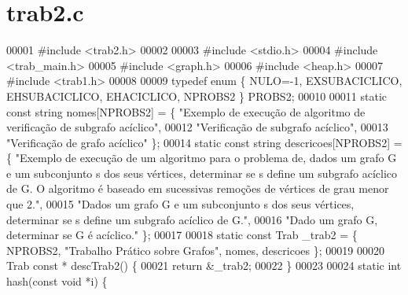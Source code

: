 \section{trab2.\+c}
\label{trab2_8c_source}

\begin{DoxyCode}
00001 \textcolor{preprocessor}{#include <trab2.h>}
00002 
00003 \textcolor{preprocessor}{#include <stdio.h>}
00004 \textcolor{preprocessor}{#include <trab_main.h>}
00005 \textcolor{preprocessor}{#include <graph.h>}
00006 \textcolor{preprocessor}{#include <heap.h>}
00007 \textcolor{preprocessor}{#include <trab1.h>}
00008 
00009 \textcolor{keyword}{typedef} \textcolor{keyword}{enum} \{ NULO=-1, EXSUBACICLICO, EHSUBACICLICO, EHACICLICO, NPROBS2 \} PROBS2;
00010 
00011 \textcolor{keyword}{static} \textcolor{keyword}{const} \textcolor{keywordtype}{string} nomes[NPROBS2] = \{  \textcolor{stringliteral}{"Exemplo de execução de algoritmo de verificação de subgrafo
       acíclico"},
00012                                                                                 \textcolor{stringliteral}{"Verificação de subgrafo
       acíclico"},
00013                                                                                 \textcolor{stringliteral}{"Verificação de grafo
       acíclico"} \};
00014 \textcolor{keyword}{static} \textcolor{keyword}{const} \textcolor{keywordtype}{string} descricoes[NPROBS2] = \{ \textcolor{stringliteral}{"Exemplo de execução de um algoritmo para o problema de, dados
       um grafo G e um subconjunto s dos seus vértices, determinar se s define um subgrafo acíclico de G. O
       algoritmo é baseado em sucessivas remoções de vértices de grau menor que 2."},
00015                                                                                         \textcolor{stringliteral}{"Dados um grafo G e
       um subconjunto s dos seus vértices, determinar se s define um subgrafo acíclico de G."},
00016                                                                                         \textcolor{stringliteral}{"Dado um grafo G,
       determinar se G é acíclico."} \};
00017 
00018 \textcolor{keyword}{static} \textcolor{keyword}{const} Trab \_trab2 = \{ NPROBS2, \textcolor{stringliteral}{"Trabalho Prático sobre Grafos"}, nomes, descricoes \};
00019 
00020 Trab \textcolor{keyword}{const} * descTrab2() \{
00021         \textcolor{keywordflow}{return} &\_trab2;
00022 \}
00023 
00024 \textcolor{keyword}{static} \textcolor{keywordtype}{int} hash(\textcolor{keyword}{const} \textcolor{keywordtype}{void} *i) \{

\end{DoxyCode}

